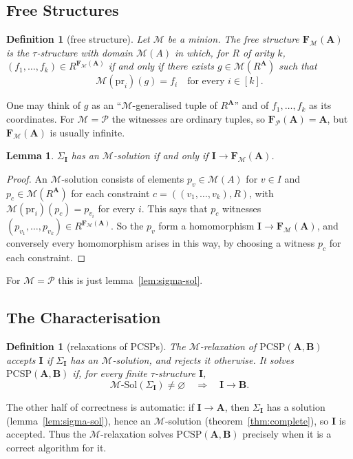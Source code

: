 \documentclass[11pt]{article}
\theoremstyle{plain}
\newtheorem{lemma}[theorem]{Lemma}
\newtheorem{definition}[theorem]{Definition}
\theoremstyle{definition}
\newcommand{\Solm}[1]{#1\text{-}\mathrm{Sol}}
\newcommand{\pr}{\mathrm{pr}}
\newcommand{\bA}{\mathbf{A}}
\newcommand{\bB}{\mathbf{B}}
\newcommand{\bI}{\mathbf{I}}
\newcommand{\bF}{\mathbf{F}}
\newcommand{\Pm}{\mathscr{P}}
\newcommand{\M}{\mathscr{M}}
\newcommand{\PCSP}{\mathrm{PCSP}}
\begin{document}
\subsection{Free Structures}\label{sec:free}

\begin{definition}[free structure]\label{def:free}
Let $\M$ be a minion. The \emph{free structure} $\bF_\M(\bA)$ is the $\tau$-structure with domain $\M(A)$ in which, for $R$ of arity $k$, $(f_1,\dots,f_k)\in R^{\bF_\M(\bA)}$ if and only if there exists $g\in\M(R^{\bA})$ such that
\[
\M(\pr_i)(g)=f_i\quad\text{for every } i\in[k].
\]
\end{definition}

One may think of $g$ as an ``$\M$-generalised tuple of $R^{\bA}$'' and of $f_1,\dots,f_k$ as its coordinates. For $\M=\Pm$ the witnesses are ordinary tuples, so $\bF_\Pm(\bA)=\bA$, but $\bF_\M(\bA)$ is usually infinite.

\begin{lemma}\label{lem:free-sol}
$\Sigma_{\bI}$ has an $\M$-solution if and only if $\bI\to\bF_\M(\bA)$.
\end{lemma}

\begin{proof}
An $\M$-solution consists of elements $p_v\in\M(A)$ for $v\in I$ and $p_c\in\M(R^{\bA})$ for each constraint $c=((v_1,\dots,v_k),R)$, with $\M(\pr_i)(p_c)=p_{v_i}$ for every $i$. This says that $p_c$ witnesses $(p_{v_1},\dots,p_{v_k})\in R^{\bF_\M(\bA)}$. So the $p_v$ form a homomorphism $\bI\to\bF_\M(\bA)$, and conversely every homomorphism arises in this way, by choosing a witness $p_c$ for each constraint.
\end{proof}

For $\M=\Pm$ this is just lemma~\ref{lem:sigma-sol}.

\subsection{The Characterisation}

\begin{definition}[relaxations of PCSPs]
The \emph{$\M$-relaxation of $\PCSP(\bA,\bB)$} accepts $\bI$ if $\Sigma_{\bI}$ has an $\M$-solution, and rejects it otherwise. It \emph{solves} $\PCSP(\bA,\bB)$ if, for every finite $\tau$-structure $\bI$,
\[
\Solm{\M}(\Sigma_{\bI})\neq\varnothing\quad\Longrightarrow\quad\bI\to\bB.
\]
\end{definition}

The other half of correctness is automatic: if $\bI\to\bA$, then $\Sigma_{\bI}$ has a solution (lemma~\ref{lem:sigma-sol}), hence an $\M$-solution (theorem~\ref{thm:complete}), so $\bI$ is accepted. Thus the $\M$-relaxation solves $\PCSP(\bA,\bB)$ precisely when it is a correct algorithm for it.
\end{document}
